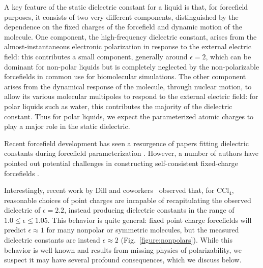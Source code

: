 \documentclass[aip, jcp, reprint]{revtex4-1}  %
\begin{document}
A key feature of the static dielectric constant for a liquid is that, for forcefield purposes, it consists of two very different components, distinguished by the dependence on the fixed charges of the forcefield and dynamic motion of the molecule. One component, the high-frequency dielectric constant, arises from the almost-instantaneous electronic polarization in response to the external electric field: this contributes a small component, generally around $\epsilon = 2$, which can be dominant for non-polar liquids but is completely neglected by the non-polarizable forcefields in common use for biomolecular simulations. The other component arises from the dynamical response of the molecule, through nuclear motion, to allow its various molecular multipoles to respond to the external electric field: for polar liquids such as water, this contributes the majority of the dielectric constant. Thus for polar liquids, we expect the parameterized atomic charges to play a major role in the static dielectric.  

Recent forcefield development has seen a resurgence of papers fitting dielectric constants during forcefield parameterization \cite{wang2014building, fennell2014fixed}.  
However, a number of authors have pointed out potential challenges in constructing self-consistent fixed-charge forcefields \cite{fennell2012simple, leontyev2014polarizable}.  


Interestingly, recent work by Dill and coworkers~\cite{fennell2012simple} observed that, for $\mathrm{CCl_4}$, reasonable choices of point charges are incapable of recapitulating the observed dielectric of $\epsilon = 2.2$, instead producing dielectric constants in the range of $1.0 \le \epsilon \le 1.05$.  
This behavior is quite general: fixed point charge forcefields will predict $\epsilon \approx 1$ for many nonpolar or symmetric molecules, but the measured dielectric constants are instead $\epsilon \approx 2$ (Fig.~\ref{figure:nonpolars}).  
While this behavior is well-known and results from missing physics of polarizability, we suspect it may have several profound consequences, which we discuss below.


\end{document}
